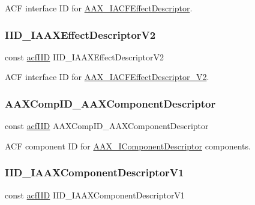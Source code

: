 A\+CF interface ID for \mbox{\hyperlink{a01653}{A\+A\+X\+\_\+\+I\+A\+C\+F\+Effect\+Descriptor}}. 

\mbox{\label{a00683_ab26eee1ffa892e6c7ca88d16f967c0da}} 
\subsubsection{\texorpdfstring{IID\_IAAXEffectDescriptorV2}{IID\_IAAXEffectDescriptorV2}}
{\footnotesize\ttfamily const \mbox{\hyperlink{a00269_a59df0b41744eee7a066787aaedf97f67}{acf\+I\+ID}} I\+I\+D\+\_\+\+I\+A\+A\+X\+Effect\+Descriptor\+V2}



A\+CF interface ID for \mbox{\hyperlink{a01657}{A\+A\+X\+\_\+\+I\+A\+C\+F\+Effect\+Descriptor\+\_\+\+V2}}. 

\mbox{\label{a00683_a765e040fc408fdf5c21f7078d3a38566}} 
\subsubsection{\texorpdfstring{AAXCompID\_AAXComponentDescriptor}{AAXCompID\_AAXComponentDescriptor}}
{\footnotesize\ttfamily const \mbox{\hyperlink{a00269_a59df0b41744eee7a066787aaedf97f67}{acf\+I\+ID}} A\+A\+X\+Comp\+I\+D\+\_\+\+A\+A\+X\+Component\+Descriptor}



A\+CF component ID for \mbox{\hyperlink{a01781}{A\+A\+X\+\_\+\+I\+Component\+Descriptor}} components. 

\mbox{\label{a00683_a0b4fc5adc909e67eef6a787aa2acdd7e}} 
\subsubsection{\texorpdfstring{IID\_IAAXComponentDescriptorV1}{IID\_IAAXComponentDescriptorV1}}
{\footnotesize\ttfamily const \mbox{\hyperlink{a00269_a59df0b41744eee7a066787aaedf97f67}{acf\+I\+ID}} I\+I\+D\+\_\+\+I\+A\+A\+X\+Component\+Descriptor\+V1}



